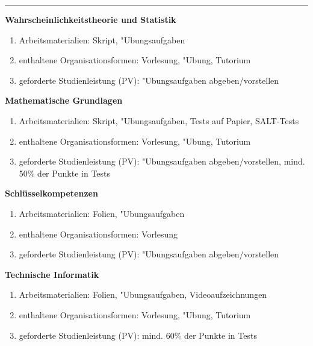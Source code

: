 \documentclass[10pt, oneside]{article}
\begin{document}
\vspace{10pt}
\hrule

\begin{multicols}{2}

\textbf{Wahrscheinlichkeitstheorie und Statistik}

\begin{enumerate}[-]
    \item Arbeitsmaterialien: Skript, "Ubungsaufgaben
    \item enthaltene Organisationsformen: Vorlesung, "Ubung, Tutorium
    \item geforderte Studienleistung (PV): "Ubungsaufgaben abgeben/vorstellen
\end{enumerate}

\columnbreak

\textbf{Mathematische Grundlagen}

\begin{enumerate}[-]
    \item Arbeitsmaterialien: Skript, "Ubungsaufgaben, Tests auf Papier, SALT-Tests
    \item enthaltene Organisationsformen: Vorlesung, "Ubung, Tutorium
    \item geforderte Studienleistung (PV): "Ubungsaufgaben abgeben/vorstellen, mind. 50\% der Punkte in Tests
\end{enumerate}

\end{multicols}

\vspace{10pt}

\begin{multicols}{2}

\textbf{Schlüsselkompetenzen}

\begin{enumerate}[-]
    \item Arbeitsmaterialien: Folien, "Ubungsaufgaben
    \item enthaltene Organisationsformen: Vorlesung
    \item geforderte Studienleistung (PV): "Ubungsaufgaben abgeben/vorstellen
\end{enumerate}

\columnbreak

\textbf{Technische Informatik}

\begin{enumerate}[-]
    \item Arbeitsmaterialien: Folien, "Ubungsaufgaben, Videoaufzeichnungen
    \item enthaltene Organisationsformen: Vorlesung, "Ubung, Tutorium
    \item geforderte Studienleistung (PV): mind. 60\% der Punkte in Tests
\end{enumerate}

\end{multicols}
\end{document}
